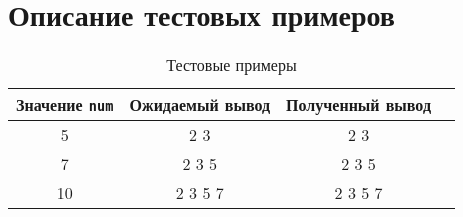 \section{Описание тестовых примеров}

\begin{table}[H]
  \centering
  \begin{tabular}{|| c | c | c | c ||}
    \hline
    Значение \texttt{num} & Ожидаемый вывод & Полученный вывод \\
    \hline\hline
    5 & 2 3 & 2 3 \\
    \hline
    7 & 2 3 5 & 2 3 5 \\
    \hline
    10 & 2 3 5 7 & 2 3 5 7 \\
    \hline
  \end{tabular}
  \caption{Тестовые примеры}
\end{table}

